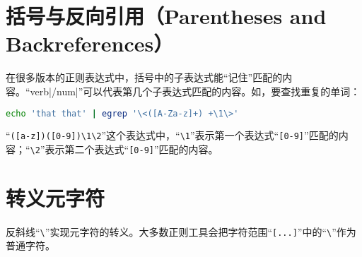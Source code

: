 \section{括号与反向引用（Parentheses and Backreferences）}

在很多版本的正则表达式中，括号中的子表达式能“记住”匹配的内容。“verb|/num|”可以代表第几个子表达式匹配的内容。如，要查找重复的单词：

\begin{lstlisting}[language=bash]
echo 'that that' | egrep '\<([A-Za-z]+) +\1\>'
\end{lstlisting}

“\verb|([a-z])([0-9])\1\2|”这个表达式中，“\verb|\1|”表示第一个表达式“\verb|[0-9]|”匹配的内容；“\verb|\2|”表示第二个表达式“\verb|[0-9]|”匹配的内容。

\section{转义元字符}

反斜线“\verb|\|”实现元字符的转义。大多数正则工具会把字符范围“\verb|[...]|”中的“\verb|\|”作为普通字符。




